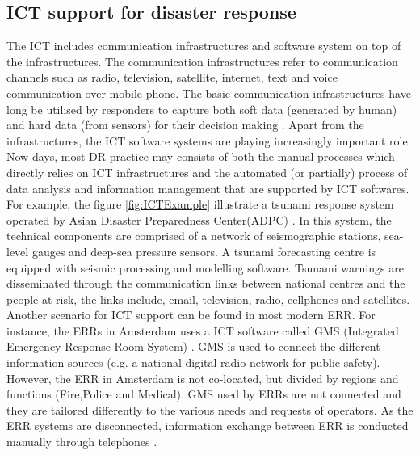 \subsection{ICT support for disaster response}
The \acf{ICT} includes communication infrastructures and software system on top of the infrastructures. The communication infrastructures refer to communication channels such as radio, television, satellite, internet, text and voice communication over mobile phone. The basic communication infrastructures have long be utilised by responders to capture both soft data (generated by human) and hard data (from sensors) for their decision making \cite{Fischer2012}. Apart from the infrastructures, the \ac{ICT} software systems are playing increasingly important role. Now days, most DR practice may consists  of both the manual processes which directly relies on \ac{ICT} infrastructures and the automated (or partially) process of data analysis and information management that are supported by \ac{ICT} softwares. For example, the figure \ref{fig:ICTExample} illustrate a tsunami response system operated by Asian Disaster Preparedness Center(ADPC) \cite{Wattegama2012}. In this system,  the technical components are comprised of a network of seismographic stations, sea-level gauges and deep-sea pressure sensors. A tsunami forecasting centre is equipped with seismic processing and modelling software.  Tsunami warnings are disseminated through the communication links between national centres and the people at risk, the links include, email, television, radio, cellphones and satellites. Another scenario for \ac{ICT} support can be found in most modern \acf{ERR}. For instance, the ERRs in Amsterdam uses a \ac{ICT} software called GMS (Integrated Emergency Response Room System) \cite{Boersma2009}. GMS is used to connect the different information sources (e.g. a national digital radio network for public safety). However, the \ac{ERR} in Amsterdam is not co-located, but divided by regions and functions (Fire,Police and Medical). GMS used by \acf{ERR}s are not connected and they are tailored differently to the various needs and requests of operators. As the \acf{ERR} systems are disconnected, information exchange between \ac{ERR} is conducted manually through telephones \cite{Boersma2009}.\\

